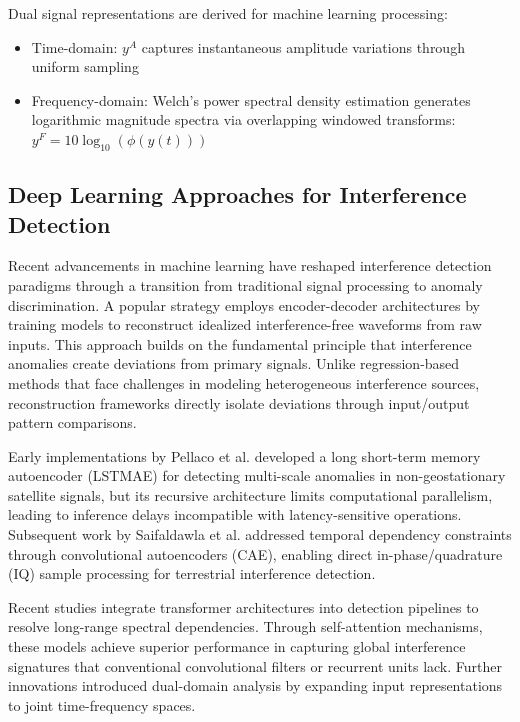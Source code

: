 \documentclass[conference]{IEEEtran}
\begin{document}
Dual signal representations are derived for machine learning processing:
\begin{itemize}
    \item Time-domain: $y^A$ captures instantaneous amplitude variations through uniform sampling
    \item Frequency-domain: Welch's power spectral density estimation generates logarithmic magnitude spectra via overlapping windowed transforms: $y^F = 10\log_{10}(\phi(y(t)))$
\end{itemize}

\subsection{Deep Learning Approaches for Interference Detection}
\label{ssec:related_works}

Recent advancements in machine learning have reshaped interference detection paradigms through a transition from traditional signal processing to anomaly discrimination. A popular strategy employs encoder-decoder architectures by training models to reconstruct idealized interference-free waveforms from raw inputs. This approach builds on the fundamental principle that interference anomalies create deviations from primary signals. Unlike regression-based methods that face challenges in modeling heterogeneous interference sources, reconstruction frameworks directly isolate deviations through input/output pattern comparisons.

Early implementations by Pellaco et al. \cite{pellacoSpectrumPredictionInterference2019} developed a long short-term memory autoencoder (LSTMAE) for detecting multi-scale anomalies in non-geostationary satellite signals, but its recursive architecture limits computational parallelism, leading to inference delays incompatible with latency-sensitive operations. Subsequent work by Saifaldawla et al. \cite{saifaldawlaConvolutionalAutoencodersNonGeostationary2024} addressed temporal dependency constraints through convolutional autoencoders (CAE), enabling direct in-phase/quadrature (IQ) sample processing for terrestrial interference detection.

Recent studies \cite{saifaldawlaGenAIBasedModelsNGSO2024} integrate transformer architectures into detection pipelines to resolve long-range spectral dependencies. Through self-attention mechanisms, these models achieve superior performance in capturing global interference signatures that conventional convolutional filters or recurrent units lack. Further innovations introduced dual-domain analysis by expanding input representations to joint time-frequency spaces.
\end{document}
